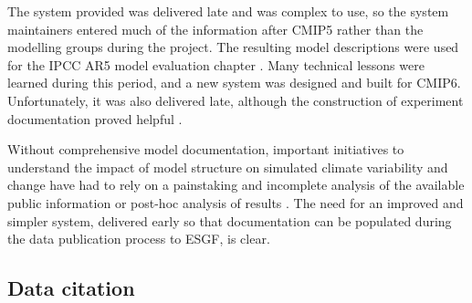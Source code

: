 \documentclass[manuscript]{copernicus}
\newcommand{\mycomment}[1]{}
\def\cred#1{{\color{red}#1}}
\begin{document}
The system provided was delivered late and was complex to use, so the system maintainers entered much of the information after CMIP5 rather than the modelling groups during the project. The resulting model descriptions were used for the IPCC AR5 model evaluation chapter \citep{flato_evaluation_2013}. Many technical lessons were learned during this period, and a new system was designed and built for CMIP6. Unfortunately, it was also delivered late, although the construction of experiment documentation proved helpful \citep{pascoe_documenting_2020}.

Without comprehensive model documentation, important initiatives to understand the impact of model structure on simulated climate variability and change have had to rely on a painstaking and incomplete analysis of the available public information \cite[e.g.][]{boe_interdependency_2018} or post-hoc analysis of results \citep[e.g.,][]{masson_climate_2011,knutti_climate_2013}. The need for an improved and simpler system, delivered early so that documentation can be populated during the data publication process to ESGF, is clear.

\mycomment{
The importance of such documentation is still recognised, and so for CMIP7, a simpler process that can be deployed early, easily maintained alongside existing CVs, and should be easier to populate has been designed. This ``Essential Model Documentation'' will be required before data can be published into the CMIP7 component of the ESGF.
David noted WIP telco 241022: CMIP5/Metafor \citep{guilyardi_cmip5_2011} overly constrained [drop down boxes]; CMIP6/ES-Docs \citep{pascoe_documenting_2020} too loosely constrained; CMIP7 EMD this should hopefully hit the sweet spot; Note comprehensive model documentation allows for more quantitative use of data; model genealogy \citep[e.g.,][]{masson_climate_2011,knutti_climate_2013} can be incorporated into multi-model assessment
Ron S: The notable MOM ocean model documentation needs to be noted here. It was the first complete model documentation I know and is still the best.
https://extranet.gfdl.noaa.gov/~vb/talks/curator-metafor-cmip5.pdf - CURATOR NSF funded METAFOR precursor
https://www.gfdl.noaa.gov/modeling-systems/fre/curator/
}


\subsection{Data citation}
\label{sec:DataCitation}
\end{document}
